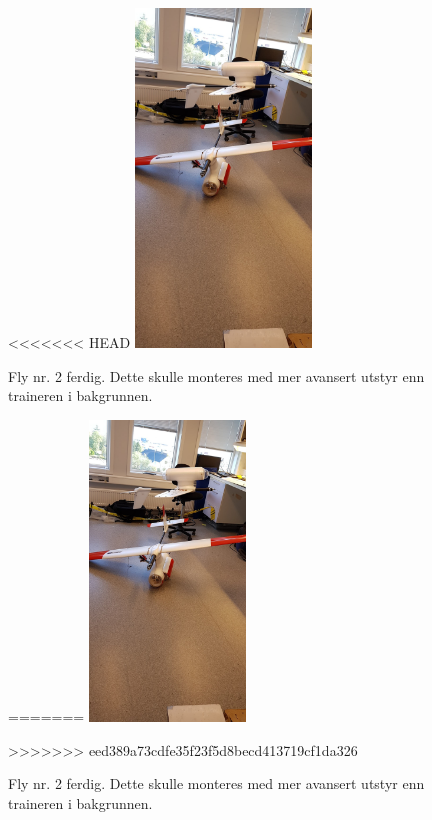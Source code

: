 \documentclass[12pt, a4paper]{article}
\begin{document}
\begin{figure}[h]
	\centering
<<<<<<< HEAD
	\includegraphics[width = .45\textwidth, height = 9cm]{bilder/andre_fly_ferdigstilt.jpg}
	\caption{Fly nr. 2 ferdig. Dette skulle monteres med mer avansert utstyr enn traineren i bakgrunnen.}
=======
	\includegraphics[width = .6\textwidth, height = 8cm]{bilder/andre_fly_ferdigstilt.jpg}
	\caption[Fly nummer to ferdig]{Fly nr. 2 ferdig. Dette skulle monteres med mer avansert utstyr enn traineren i bakgrunnen.}
>>>>>>> eed389a73cdfe35f23f5d8becd413719cf1da326
\end{figure}
\end{document}
